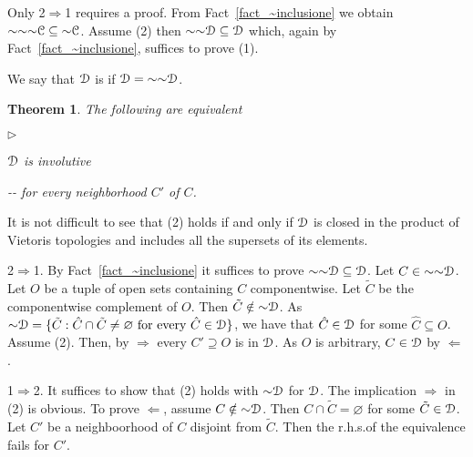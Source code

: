 \documentclass{amsproc}
\makeatletter
\newcommand{\mylabel}[1]{{#1}\hfill}
\renewenvironment{itemize}
  {\begin{list}{$\triangleright$}{%
  \setlength{\parskip}{0mm}
  \setlength{\topsep}{.1\baselineskip}
  \setlength{\rightmargin}{0mm}
  \setlength{\listparindent}{0mm}
  \setlength{\itemindent}{0mm}
  \setlength{\labelwidth}{3ex}
  \setlength{\itemsep}{.1\baselineskip}
  \setlength{\parsep}{.1\baselineskip}
  \setlength{\partopsep}{0mm}
  \setlength{\labelsep}{1ex}
  \setlength{\leftmargin}{\labelwidth+\labelsep}
  \let\makelabel\mylabel}}{%
\end{list}}
\newcounter{thm}
\theoremstyle{mio}
\newtheorem{theorem}[thm]{Theorem}\tcolorboxenvironment{theorem}{mythm}
\providecommand{\proofNameStyle}{\bfseries}
\renewenvironment{proof}[1][\proofname]{\par
  \pushQED{\qed}%
  \normalfont%
  \trivlist
  \item[\hskip\labelsep
        \proofNameStyle
    #1\@addpunct{.}]\ignorespaces
}{%
  \popQED\endtrivlist\@endpefalse
}
\renewcommand*{\emph}[1]{%
   \smash{\tikz[baseline]\node[rectangle, fill=teal!25, rounded corners, inner xsep=0.5ex, inner ysep=0.2ex, anchor=base, minimum height = 2.7ex]{\strut #1};}}
\makeatother
\begin{document}
\begin{proof}
  Only 2$\Rightarrow$1 requires a proof.
  From Fact~\ref{fact_~inclusione} we obtain ${\sim}{\sim}{\sim}{\EuScript C}\subseteq{\sim}{\EuScript C}$.
  Assume (2) then ${\sim}{\sim}{\EuScript D}\subseteq{\EuScript D}$ which, again by Fact~\ref{fact_~inclusione}, suffices to prove (1).
\end{proof}

We say that ${\EuScript D}$ is \emph{involutive\/} if ${\EuScript D}={\sim}{\sim}{\EuScript D}$.

\begin{theorem}
  The following are equivalent
  \begin{itemize}
    \item [1.] ${\EuScript D}$ is involutive 
    \item [2.] \noindent\kern-\kern-
     for every neighborhood $C'$ of $C$.
  \end{itemize}
\end{theorem}

It is not difficult to see that (2) holds if and only if ${\EuScript D}$ is closed in the product of Vietoris topologies and includes all the supersets of its elements.

\begin{proof}
  2$\Rightarrow$1.
  By Fact~\ref{fact_~inclusione} it suffices to prove ${\sim}{\sim}{\EuScript D}\subseteq{\EuScript D}$.
  Let $C\in{\sim}{\sim}{\EuScript D}$.
  Let $O$ be a tuple of open sets containing $C$ componentwise.
  Let $\tilde C$ be the componentwise complement of $O$.  
  Then $\tilde C\notin{\sim}{\EuScript D}$.
  As ${\sim}{\EuScript D}=\{\tilde C:  \hat C\cap\tilde C\neq\varnothing\text{ for every }\hat C\in{\EuScript D}\}$, we have that $\hat C\in{\EuScript D}$ for some $\hat C\subseteq O$.
  Assume (2).
  Then, by $\Rightarrow$ every $C'\supseteq O$ is in ${\EuScript D}$.
  As $O$ is arbitrary, $C\in {\EuScript D}$ by $\Leftarrow$.

  1$\Rightarrow$2.
  It suffices to show that (2) holds with ${\sim}{\EuScript D}$ for ${\EuScript D}$.
  The implication $\Rightarrow$ in (2) is obvious.
  To prove $\Leftarrow$, assume $C\notin{\sim}{\EuScript D}$.
  Then $C\cap\tilde C=\varnothing$ for some $\tilde C\in{\EuScript D}$.
  Let $C'$ be a neighboorhood of $C$ disjoint from $\tilde C$.
  Then the r.h.s.\@ of the equivalence fails for $C'$.  
\end{proof}
\end{document}
